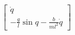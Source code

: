 \documentclass[preview]{standalone}
\begin{document}
\begin{align*}
\begin{bmatrix}\dot{q} \\ -\frac{g}{l}\sin{q}-\frac{b}{ml^2}\dot{q}\end{bmatrix}
\end{align*}
\end{document}
